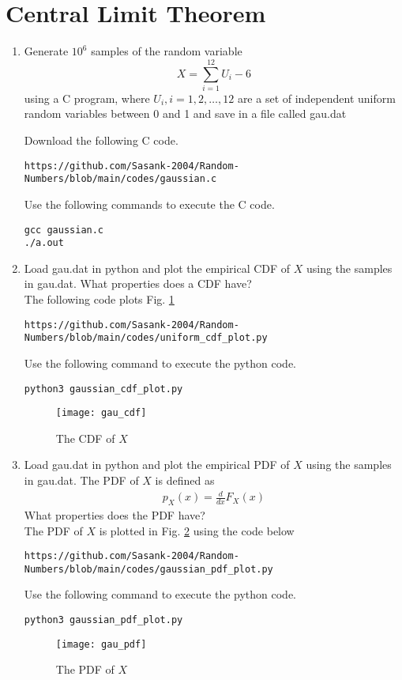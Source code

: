 \documentclass[journal,12pt,twocolumn]{IEEEtran}
\renewcommand\thesection{\arabic{section}}
\begin{document}
\section{Central Limit Theorem}
%
\begin{enumerate}[label=\thesection.\arabic*
,ref=\thesection.\theenumi]

%
\item
Generate $10^6$ samples of the random variable
%
\begin{equation}
X = \sum_{i=1}^{12}U_i -6
\end{equation}
%
using a C program, where $U_i, i = 1,2,\dots, 12$ are  a set of independent uniform random variables between 0 and 1
and save in a file called gau.dat

%
\solution  Download the following  C code.
\begin{lstlisting}
https://github.com/Sasank-2004/Random-Numbers/blob/main/codes/gaussian.c 
\end{lstlisting}
Use the following commands to execute the C code.
\begin{lstlisting}
gcc gaussian.c
./a.out 
\end{lstlisting}
\item
Load gau.dat in python and plot the empirical CDF of $X$ using the samples in gau.dat. What properties does a CDF have?
\\
\solution The following code plots Fig. \ref{fig:gau_cdf}
\begin{lstlisting}
https://github.com/Sasank-2004/Random-Numbers/blob/main/codes/uniform_cdf_plot.py 
\end{lstlisting}
Use the following command to execute the python code.
\begin{lstlisting}
python3 gaussian_cdf_plot.py
\end{lstlisting}
\begin{figure}[h]
\centering
\texttt{[image: gau\_cdf]}
\caption{The CDF of $X$}
\label{fig:gau_cdf}
\end{figure}
\item
Load gau.dat in python and plot the empirical PDF of $X$ using the samples in gau.dat. The PDF of $X$ is defined as
\begin{align}
p_{X}(x) = \frac{d}{dx}F_{X}(x)
\end{align}
What properties does the PDF have?
\\
\solution The PDF of $X$ is plotted in Fig. \ref{fig:gau_pdf} using the code below
\begin{lstlisting}
https://github.com/Sasank-2004/Random-Numbers/blob/main/codes/gaussian_pdf_plot.py 
\end{lstlisting}
Use the following command to execute the python code.
\begin{lstlisting}
python3 gaussian_pdf_plot.py
\end{lstlisting}
\pagebreak
\begin{figure}[h]
\centering
\texttt{[image: gau\_pdf]}
\caption{The PDF of $X$}
\label{fig:gau_pdf}
\end{figure}


\end{enumerate}
\end{document}
